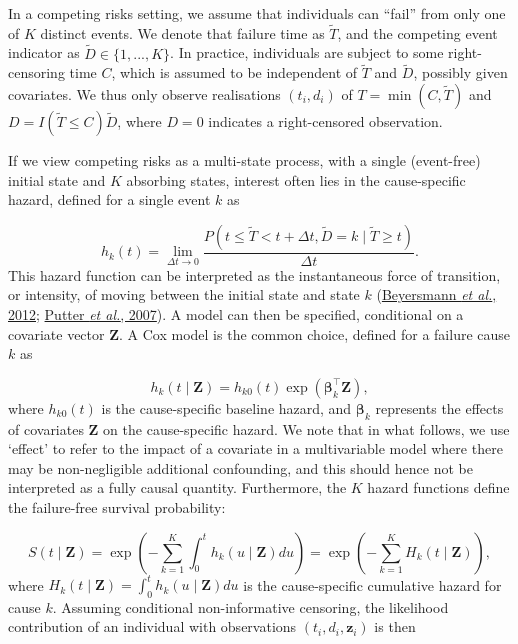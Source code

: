 \documentclass[
  letterpaper,
  DIV=11,
  numbers=noendperiod]{scrreprt}
\begin{document}
In a competing risks setting, we assume that individuals can ``fail''
from only one of \(K\) distinct events. We denote that failure time as
\(\tilde{T}\), and the competing event indicator as
\(\tilde{D} \in \{1,...,K\}\). In practice, individuals are subject to
some right-censoring time \(C\), which is assumed to be independent of
\(\tilde{T}\) and \(\tilde{D}\), possibly given covariates. We thus only
observe realisations \((t_i, d_i)\) of \(T = \min(C,\tilde{T})\) and
\(D = I(\tilde{T} \leq C)\tilde{D}\), where \(D = 0\) indicates a
right-censored observation.

If we view competing risks as a multi-state process, with a single
(event-free) initial state and \(K\) absorbing states, interest often
lies in the cause-specific hazard, defined for a single event \(k\) as

\begin{equation*}
    h_k(t) = \lim_{\Delta t \to 0} \frac{P(t \leq \tilde{T} < t + \Delta t, \tilde{D} = k \mid \tilde{T} \geq t)}{\Delta t}.
\end{equation*} This hazard function can be interpreted as the
instantaneous force of transition, or intensity, of moving between the
initial state and state \(k\)
(\protect\hyperlink{ref-beyersmannCompetingRisksMultistate2012}{Beyersmann
\emph{et al.}, 2012};
\protect\hyperlink{ref-putterTutorialBiostatisticsCompeting2007}{Putter
\emph{et al.}, 2007}). A model can then be specified, conditional on a
covariate vector \(\mathbf{Z}\). A Cox model is the common choice,
defined for a failure cause \(k\) as

\begin{equation*}
    h_k(t \mid \mathbf{Z}) = h_{k0}(t)\exp(\boldsymbol{\beta}_k^\intercal \mathbf{Z}),
\end{equation*} where \(h_{k0}(t)\) is the cause-specific baseline
hazard, and \(\boldsymbol{\beta}_k\) represents the effects of
covariates \(\mathbf{Z}\) on the cause-specific hazard. We note that in
what follows, we use `effect' to refer to the impact of a covariate in a
multivariable model where there may be non-negligible additional
confounding, and this should hence not be interpreted as a fully causal
quantity. Furthermore, the \(K\) hazard functions define the
failure-free survival probability:

\begin{equation*}
    S(t \mid \mathbf{Z}) = \exp \left( - \sum_{k = 1}^{K} \int_{0}^{t} h_k(u \mid \mathbf{Z})du \right)
        = \exp \left( - \sum_{k = 1}^{K} H_k(t \mid \mathbf{Z}) \right),
\end{equation*} where
\(H_k(t \mid \mathbf{Z}) = \int_{0}^{t} h_k(u \mid \mathbf{Z})du\) is
the cause-specific cumulative hazard for cause \(k\). Assuming
conditional non-informative censoring, the likelihood contribution of an
individual with observations \((t_i, d_i, \mathbf{z}_i)\) is then
\end{document}
